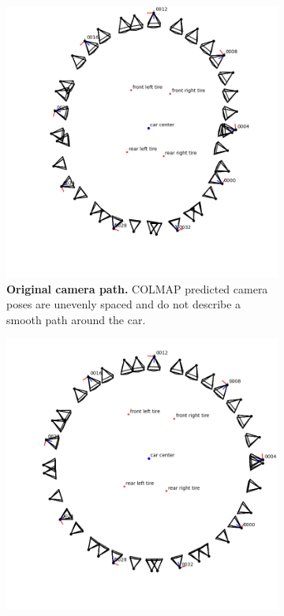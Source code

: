 \begin{figure}[htb!]
  \centering
  \begin{subfigure}[b]{0.45\linewidth}
    \includegraphics[width=\linewidth]{images/gaussiansplatting/camera-path-unstabilized.png}
    \caption{\textbf{Original camera path.} COLMAP predicted camera poses are unevenly spaced and do not describe a smooth path around the car. }
\label{fig:gs-camera-path-unstab}
  \end{subfigure}
  \quad %
  \begin{subfigure}[b]{0.45\linewidth}
    \includegraphics[width=\linewidth]{images/gaussiansplatting/camera-path-stabilized.png}

\end{subfigure}
\end{figure}
